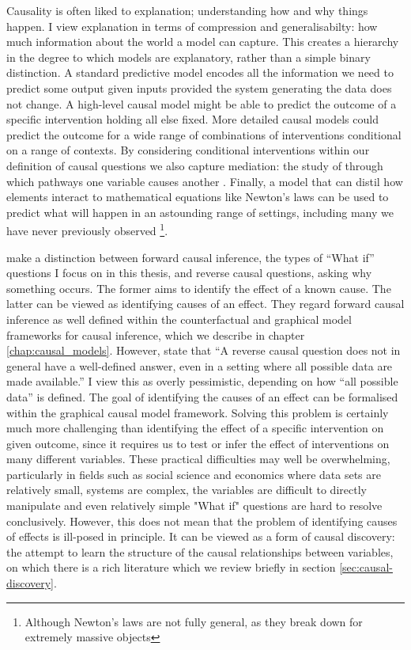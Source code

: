 \documentclass[11pt,a4paper,oneside]{book}
\newcommand{\quotes}[1]{``#1''}
\theoremstyle{plain}
\theoremstyle{definition}
\begin{document}
Causality is often liked to explanation; understanding how and why things happen. I view explanation in terms of compression and generalisabilty: how much information about the world a model can capture. This creates a hierarchy in the degree to which models are explanatory, rather than a simple binary distinction. A standard predictive model encodes all the information we need to predict some output given inputs provided the system generating the data does not change. A high-level causal model might be able to predict the outcome of a specific intervention holding all else fixed. More detailed causal models could predict the outcome for a wide range of combinations of interventions conditional on a range of contexts. By considering conditional interventions within our definition of causal questions we also capture mediation: the study of through which pathways one variable causes another \cite{vanderweele2015explanation}. Finally, a model that can distil how elements interact to mathematical equations like Newton's laws can be used to predict what will happen in an astounding range of settings, including many we have never previously observed \footnote{Although Newton's laws are not fully general, as they break down for extremely massive objects}.

\citet{Gelman2010,gelman2013ask} make a distinction between forward causal inference, the types of \quotes{What if} questions I focus on in this thesis, and reverse causal questions, asking why something occurs. The former aims to identify the effect of a known cause. The latter can be viewed as identifying causes of an effect. They regard forward causal inference as well defined within the counterfactual and graphical model frameworks for causal inference, which we describe in chapter \ref{chap:causal_models}. However, state that \quotes{A reverse causal question does not in general have a well-defined answer, even in a setting where all possible data are made available.} I view this as overly pessimistic, depending on how \quotes{all possible data} is defined. The goal of identifying the causes of an effect can be formalised within the graphical causal model framework. Solving this problem is certainly much more challenging than identifying the effect of a specific intervention on given outcome, since it requires us to test or infer the effect of interventions on many different variables. These practical difficulties may well be overwhelming, particularly in fields such as social science and economics where data sets are relatively small, systems are complex, the variables are difficult to directly manipulate and even relatively simple "What if" questions are hard to resolve conclusively. However, this does not mean that the problem of identifying causes of effects is ill-posed in principle. It can be viewed as a form of causal discovery: the attempt to learn the structure of the causal relationships between variables, on which there is a rich literature which we review briefly in section \ref{sec:causal-discovery}.
\end{document}
